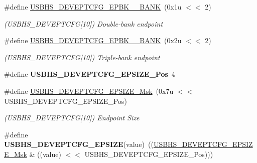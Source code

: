 \begin{DoxyCompactItemize}
\mbox{\label{group__SAME70__USBHS_ga007501247a16b5f40536efe67c660458}} 
\#define \mbox{\hyperlink{group__SAME70__USBHS_ga007501247a16b5f40536efe67c660458}{U\+S\+B\+H\+S\+\_\+\+D\+E\+V\+E\+P\+T\+C\+F\+G\+\_\+\+E\+P\+B\+K\+\_\+\_\+\+B\+A\+NK}}~(0x1u $<$$<$ 2)
\begin{DoxyCompactList}\small\item\em (U\+S\+B\+H\+S\+\_\+\+D\+E\+V\+E\+P\+T\+C\+FG\mbox{[}10\mbox{]}) Double-\/bank endpoint \end{DoxyCompactList}\item 
\mbox{\label{group__SAME70__USBHS_gaacf793331bc0eb223c5ed1a5e8712165}} 
\#define \mbox{\hyperlink{group__SAME70__USBHS_gaacf793331bc0eb223c5ed1a5e8712165}{U\+S\+B\+H\+S\+\_\+\+D\+E\+V\+E\+P\+T\+C\+F\+G\+\_\+\+E\+P\+B\+K\+\_\+\_\+\+B\+A\+NK}}~(0x2u $<$$<$ 2)
\begin{DoxyCompactList}\small\item\em (U\+S\+B\+H\+S\+\_\+\+D\+E\+V\+E\+P\+T\+C\+FG\mbox{[}10\mbox{]}) Triple-\/bank endpoint \end{DoxyCompactList}\item 
\mbox{\label{group__SAME70__USBHS_ga9680371b4a34336747267e14d1f6bf4c}} 
\#define {\bfseries U\+S\+B\+H\+S\+\_\+\+D\+E\+V\+E\+P\+T\+C\+F\+G\+\_\+\+E\+P\+S\+I\+Z\+E\+\_\+\+Pos}~4
\item 
\mbox{\label{group__SAME70__USBHS_ga5e7d8a83079e1c65a44d5028003969e0}} 
\#define \mbox{\hyperlink{group__SAME70__USBHS_ga5e7d8a83079e1c65a44d5028003969e0}{U\+S\+B\+H\+S\+\_\+\+D\+E\+V\+E\+P\+T\+C\+F\+G\+\_\+\+E\+P\+S\+I\+Z\+E\+\_\+\+Msk}}~(0x7u $<$$<$ U\+S\+B\+H\+S\+\_\+\+D\+E\+V\+E\+P\+T\+C\+F\+G\+\_\+\+E\+P\+S\+I\+Z\+E\+\_\+\+Pos)
\begin{DoxyCompactList}\small\item\em (U\+S\+B\+H\+S\+\_\+\+D\+E\+V\+E\+P\+T\+C\+FG\mbox{[}10\mbox{]}) Endpoint Size \end{DoxyCompactList}\item 
\mbox{\label{group__SAME70__USBHS_ga00d0483c92acda760b06343a5291bc53}} 
\#define {\bfseries U\+S\+B\+H\+S\+\_\+\+D\+E\+V\+E\+P\+T\+C\+F\+G\+\_\+\+E\+P\+S\+I\+ZE}(value)~((\mbox{\hyperlink{group__SAMV71__USBHS_ga5e7d8a83079e1c65a44d5028003969e0}{U\+S\+B\+H\+S\+\_\+\+D\+E\+V\+E\+P\+T\+C\+F\+G\+\_\+\+E\+P\+S\+I\+Z\+E\+\_\+\+Msk}} \& ((value) $<$$<$ U\+S\+B\+H\+S\+\_\+\+D\+E\+V\+E\+P\+T\+C\+F\+G\+\_\+\+E\+P\+S\+I\+Z\+E\+\_\+\+Pos)))

\end{DoxyCompactItemize}

